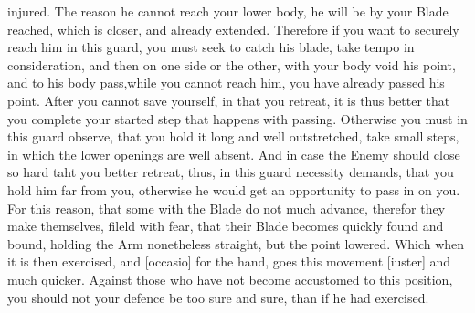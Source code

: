 \newpage


\newpage

injured. The reason he cannot reach your lower body, he will be by
your Blade reached, which is closer, and already extended.
Therefore if you want to securely reach him in this guard, you must
seek to catch his blade, take tempo in consideration, and then on one
side or the other, with your body void his point, and to his body
pass,while you cannot reach him, you have already passed his point.
After you cannot save yourself, in that you retreat, it is thus better
that you complete your started step that happens with
passing. Otherwise you must in this guard observe, that you hold it
long and well outstretched, take small steps, in which the lower
openings are well absent.
And in case the Enemy should close so hard taht you better retreat,
thus, in this guard necessity demands, that you hold him far from you,
otherwise he would get an opportunity to pass in on you. For this
reason, that some with the Blade do not much advance, therefor they
make themselves, fileld with fear, that their Blade becomes quickly
found and bound, holding the Arm nonetheless straight, but the point
lowered. Which when it is then exercised, and [occasio] for the hand,
goes this movement [iuster] and much quicker. Against those who have
not become accustomed to this position, you should not your defence be
too sure and sure, than if he had exercised.

